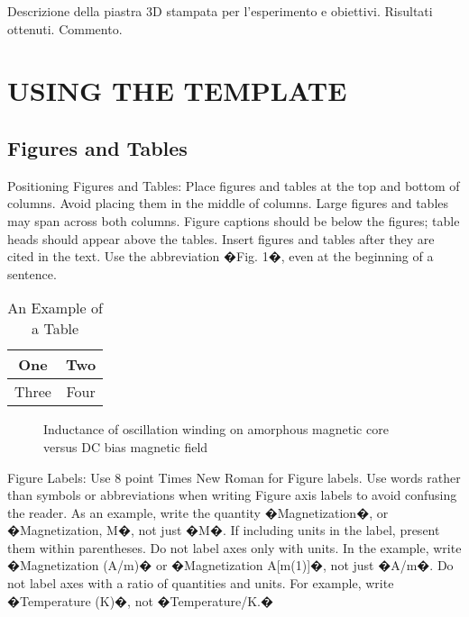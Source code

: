 \documentclass[letterpaper, 10 pt, conference]{ieeeconf}  %
\begin{document}
Descrizione della piastra 3D stampata per l'esperimento e obiettivi.
Risultati ottenuti.
Commento.


\section{USING THE TEMPLATE}

\subsection{Figures and Tables}

Positioning Figures and Tables: Place figures and tables at the top and bottom of columns. Avoid placing them in the middle of columns. Large figures and tables may span across both columns. Figure captions should be below the figures; table heads should appear above the tables. Insert figures and tables after they are cited in the text. Use the abbreviation �Fig. 1�, even at the beginning of a sentence.

\begin{table}[h]
\caption{An Example of a Table}
\label{table_example}
\begin{center}
\begin{tabular}{|c||c|}
\hline
One & Two\\
\hline
Three & Four\\
\hline
\end{tabular}
\end{center}
\end{table}


   \begin{figure}[thpb]
      \centering
      \caption{Inductance of oscillation winding on amorphous
       magnetic core versus DC bias magnetic field}
      \label{figurelabel}
   \end{figure}
   

Figure Labels: Use 8 point Times New Roman for Figure labels. Use words rather than symbols or abbreviations when writing Figure axis labels to avoid confusing the reader. As an example, write the quantity �Magnetization�, or �Magnetization, M�, not just �M�. If including units in the label, present them within parentheses. Do not label axes only with units. In the example, write �Magnetization (A/m)� or �Magnetization {A[m(1)]}�, not just �A/m�. Do not label axes with a ratio of quantities and units. For example, write �Temperature (K)�, not �Temperature/K.�
\end{document}
